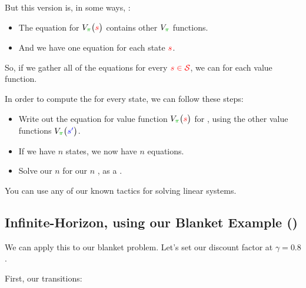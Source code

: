         But this version is, in some ways, : 

        \begin{itemize}
            \item The equation for $V_{\grn{\pi}}\big(\red{s}\big)$ contains other $V_{\grn{\pi}}$ functions.

            \item And we have one equation for each state $\textcolor{red}{s}$.
        \end{itemize}

        So, if we gather all of the equations for every $\textcolor{red}{s \in \mathcal{S}}$, we can  for each value function.
            \\

        \begin{concept}
            In order to compute the  for every state, we can follow these steps:

            \begin{itemize}
                \item Write out the equation for value function $V_{\grn{\pi}}\big(\red{s}\big)$ for , using the other value functions $V_{\grn{\pi}}\big(\blu{s'}\big)$.
                \item If we have $n$ states, we now have $n$ equations.
                \item Solve our $n$  for our $n$ , as a .
            \end{itemize}
        \end{concept}


        You can use any of our known tactics for solving linear systems.

    \pagebreak

    \subsection{Infinite-Horizon, using our Blanket Example ()}

        \miniex We can apply this to our blanket problem. Let's set our discount factor at $\gamma=0.8$.

        First, our transitions:

